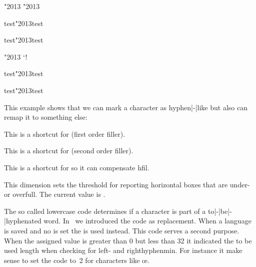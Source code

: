 \startbuffer
\hccode"2013 "2013

\hsize 50mm test\char"2013test\par
\hsize  1mm test\char"2013test\par

\hccode"2013 `!

\hsize 50mm test\char"2013test\par
\hsize  1mm test\char"2013test\par
\stopbuffer

\typebuffer

This example shows that we can mark a character as hyphen|-|like but also can
remap it to something else:

\startpacked \getbuffer \stoppacked

\stopnewprimitive

\startoldprimitive[title={\prm {hfil}}]

This is a shortcut for  (first order filler).

\stopoldprimitive

\startoldprimitive[title={\prm {hfill}}]

This is a shortcut for  (second order filler).

\stopoldprimitive

\startoldprimitive[title={\prm {hfilneg}}]

This is a shortcut for  so it can compensate \prm
{hfil}.

\stopoldprimitive

\startoldprimitive[title={\prm {hfuzz}}]

This dimension sets the threshold for reporting horizontal boxes that are under-
or overfull. The current value is \the \hfuzz.

\stopoldprimitive

\startnewprimitive[title={\prm {hjcode}}]

The so called lowercase code determines if a character is part of a
to|-|be|-|hyphenated word. In \LUATEX\ we introduced the  code as replacement. When a language is saved and no 
is set the  is used instead. This code serves a second purpose. When
the assigned value is greater than 0 but less than 32 it indicated the to be used
length when checking for left- and righthyphenmin. For instance it make sense to
set the code to~2 for characters like œ.

\stopnewprimitive

